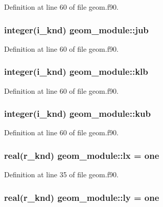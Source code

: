 Definition at line 60 of file geom.\-f90.

\hypertarget{classgeom__module_ada7a9e753e21b30a06f0858f5deb4300}{
\subsubsection[{jub}]{\setlength{\rightskip}{0pt plus 5cm}integer(i\-\_\-knd) geom\-\_\-module\-::jub}}\label{classgeom__module_ada7a9e753e21b30a06f0858f5deb4300}


Definition at line 60 of file geom.\-f90.

\hypertarget{classgeom__module_a7c3abb8b57ed30570288a1da71db8444}{
\subsubsection[{klb}]{\setlength{\rightskip}{0pt plus 5cm}integer(i\-\_\-knd) geom\-\_\-module\-::klb}}\label{classgeom__module_a7c3abb8b57ed30570288a1da71db8444}


Definition at line 60 of file geom.\-f90.

\hypertarget{classgeom__module_a79842b1abc678e999d926bc361620371}{
\subsubsection[{kub}]{\setlength{\rightskip}{0pt plus 5cm}integer(i\-\_\-knd) geom\-\_\-module\-::kub}}\label{classgeom__module_a79842b1abc678e999d926bc361620371}


Definition at line 60 of file geom.\-f90.

\hypertarget{classgeom__module_a1fe9e4dc8297fc98198b561000a97973}{
\subsubsection[{lx}]{\setlength{\rightskip}{0pt plus 5cm}real(r\-\_\-knd) geom\-\_\-module\-::lx = one}}\label{classgeom__module_a1fe9e4dc8297fc98198b561000a97973}


Definition at line 35 of file geom.\-f90.

\hypertarget{classgeom__module_adc5d5005b562bb94578c33b5bcde0012}{
\subsubsection[{ly}]{\setlength{\rightskip}{0pt plus 5cm}real(r\-\_\-knd) geom\-\_\-module\-::ly = one}}\label{classgeom__module_adc5d5005b562bb94578c33b5bcde0012}


